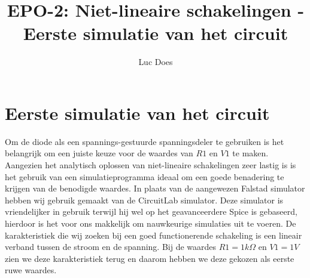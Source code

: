 \documentclass{report}
\title{EPO-2: Niet-lineaire schakelingen - Eerste simulatie van het circuit}
\author{Luc Does}
\begin{document}
\chapter{Eerste simulatie van het circuit}
\label{ch:Eerste simulatie van het circuit}

Om de diode als een spannings-gestuurde spanningsdeler te gebruiken is het belangrijk om een juiste keuze voor de waardes van $R1$ en $V1$ te maken. Aangezien het analytisch oplossen van niet-lineaire schakelingen zeer lastig is is het gebruik van een simulatieprogramma ideaal om een goede benadering te krijgen van de benodigde waardes. In plaats van de aangewezen Falstad simulator hebben wij gebruik gemaakt van de CircuitLab simulator. Deze simulator is vriendelijker in gebruik terwijl hij wel op het geavanceerdere  Spice is gebaseerd, hierdoor is het voor ons makkelijk om nauwkeurige simulaties uit te voeren.
\newline
De karakteristiek die wij zoeken bij een goed functionerende schakeling is een lineair verband tussen de stroom en de spanning. Bij de waardes $R1 = 1k\Omega$ en $V1 = 1V$ zien we deze karakteristiek terug en daarom hebben we deze gekozen als eerste ruwe waardes.
\end{document}
